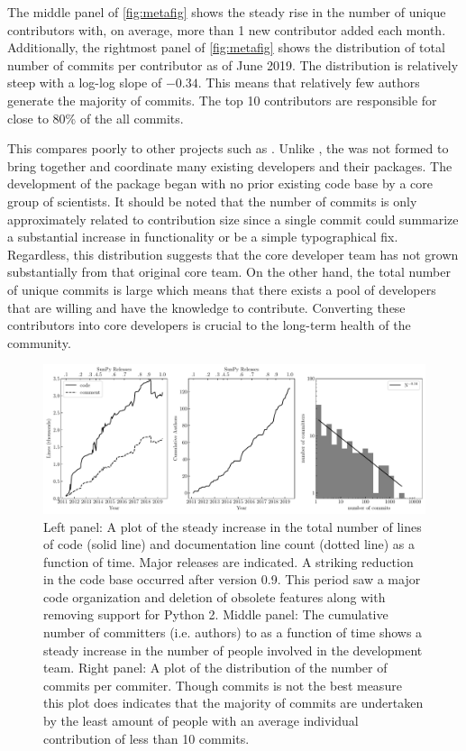 The middle panel of \autoref{fig:metafig} shows the steady rise in the number of unique contributors with, on average, more than 1 new contributor added each month.
Additionally, the rightmost panel of \autoref{fig:metafig} shows the distribution of total number of commits per contributor as of June 2019.
The distribution is relatively steep with a log-log slope of $-0.34$.
This means that relatively few authors generate the majority of commits.
The top 10 contributors are responsible for close to 80\% of the all commits. 

This compares poorly to other projects such as \astropy \citep{astropy2018}.
Unlike \astropy, the \sunpyproj was not formed to bring together and coordinate many existing developers and their \python packages.
The development of the \sunpypkg package began with no prior existing code base by a core group of scientists.
It should be noted that the number of commits is only approximately related to contribution size since a single commit could summarize a substantial increase in functionality or be a simple typographical fix.
Regardless, this distribution suggests that the core developer team has not grown substantially from that original core team.
On the other hand, the total number of unique commits is large which means that there exists a pool of \sunpypkg developers that are willing and have the knowledge to contribute.
Converting these contributors into core developers is crucial to the long-term health of the community.


\begin{figure}
    \center
    \includegraphics[width = 1.0\textwidth]{figures/dev_meta.pdf}
    \caption{Left panel: A plot of the steady increase in the total number of lines of code (solid line) and documentation line count (dotted line) as a function of time.
	Major releases are indicated.
	A striking reduction in the code base occurred after version 0.9.
	This period saw a major code organization and deletion of obsolete features along with removing support for Python 2.
	Middle panel: The cumulative number of committers (i.e. authors) to \sunpypkg as a function of time shows a steady increase in the number of people involved in the development team.
	Right panel: A plot of the distribution of the number of commits per commiter.
	Though commits is not the best measure this plot does indicates that the majority of commits are undertaken by the least amount of people with an average individual contribution of less than 10 commits.}
\label{fig:metafig}
\end{figure}